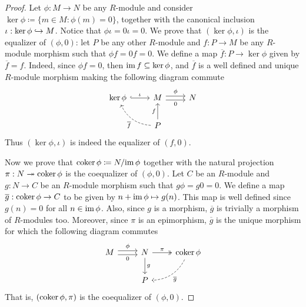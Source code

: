 \begin{proof}
    Let \(\phi: M \to N\) be any \(R\)-module and consider
    \(\ker \phi \coloneq \{m \in M \colon \phi(m) = 0\}\), together with the
    canonical inclusion \(\iota: \ker \phi \hookrightarrow M\). Notice that
    \(\phi \iota = 0 \iota = 0\). We prove that \((\ker \phi, \iota)\) is the
    equalizer of \((\phi, 0)\): let \(P\) be any other \(R\)-module and
    \(f: P \to M\) be any \(R\)-module morphism such that \(\phi f = 0 f = 0\). We
    define a map \(\overline{f}: P \to \ker \phi\) given by \(\overline{f} = f\).
    Indeed, since \(\phi f = 0\), then \(\operatorname{im} f \subseteq \ker \phi\), and
    \(\overline{f}\) is a well defined and unique \(R\)-module morphism making the
    following diagram commute
    \[
        \begin{tikzcd}
            \ker \phi \ar[r, hook, "\iota"]
            &M \ar[r, shift left, "\phi"] \ar[r, shift right, "0"']
            &N \\
            &P \ar[u, "f"] \ar[ul, dashed, bend left, "\overline{f}"] &
        \end{tikzcd}
    \]
    Thus \((\ker \phi, \iota)\) is indeed the equalizer of \((f, 0)\).

    Now we prove that \(\operatorname{coker} \phi \coloneq N/{\operatorname{im} \phi}\) together with the
    natural projection \(\pi: N \twoheadrightarrow \operatorname{coker} \phi\) is the coequalizer of
    \((\phi, 0)\). Let \(C\) be an \(R\)-module and \(g: N \to C\) be an
    \(R\)-module morphism such that \(g \phi = g 0 = 0\). We define a map
    \(\overline{g}: \operatorname{coker} \phi \to C\) to be given by \(n + \operatorname{im} \phi \mapsto
    g(n)\). This map is well defined since \(g(n) = 0\) for all \(n \in \operatorname{im}
    \phi\). Also, since \(g\) is a morphism, \(\overline{g}\) is trivially a
    morphism of \(R\)-modules too. Moreover, since \(\pi\) is an epimorphism,
    \(\overline{g}\) is the unique morphism for which the following diagram commutes
    \[
        \begin{tikzcd}
            M \ar[r, shift left, "\phi"] \ar[r, shift right, "0"']
            & N \ar[r, two heads, "\pi"] \ar[d, "g"]
            &\coker \phi \ar[dl, bend left, dashed, "\overline{g}"]
            \\
            &P &
        \end{tikzcd}
    \]
    That is, \((\operatorname{coker} \phi, \pi)\) is the coequalizer of \((\phi, 0)\).
\end{proof}

